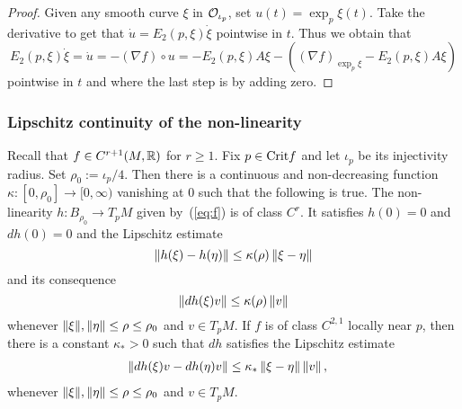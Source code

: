 \documentclass{article}
\begin{document}
\begin{proof}
Given any smooth curve $\xi$ in ${\mathcal{O}}_{\iota_p}$, set
$u(t)=\exp_p\xi(t)$. Take the derivative
to get that $\dot u=E_2(p,\xi)\dot\xi$
pointwise in $t$. Thus we obtain that
$$
     E_2(p,\xi)\dot\xi=\dot u
     =-(\nabla f)\circ u
     =-E_2(p,\xi)A\xi
     -\left((\nabla f)_{\exp_p\xi}-E_2(p,\xi)A\xi\right)
$$
pointwise in $t$ and where the last step is by
adding zero.
\end{proof}


\subsubsection*{Lipschitz continuity of the non-linearity}%
\begin{lemma}
\label{le:f}
   Recall that $f\in C^{r+1}(M,{\mathbb{R}})$ for $r\ge 1$. Fix $p\in{\rm Crit} f$
   and let $\iota_p$ be its injectivity radius. Set $\rho_0:=\iota_p/4$. Then there is
   a continuous and non-decreasing function $\kappa:[0,\rho_0]\to[0,\infty)$
   vanishing at $0$ such that the following is true.
   The non-linearity $h:B_{\rho_0}\to T_pM$ given by~(\ref{eq:f}) is
   of class $C^r$. It satisfies $h(0)=0$ and $dh(0)=0$ and the Lipschitz estimate
   \begin{equation*}
     \left\|h(\xi)-h(\eta)\right\|
     \le \kappa(\rho)\left\|\xi-\eta\right\|
   \end{equation*}
   and its consequence
   \begin{equation}\label{cor:f}
     \Norm{dh(\xi)v}
     \le \kappa(\rho)\Norm{v}
   \end{equation}
   whenever $\mathopen\|\xi\mathclose\|,\mathopen\|\eta\mathclose\|\le\rho\le\rho_0$ and $v\in T_pM$.
   If $f$ is of class $C^{2,1}$ locally near $p$,
   then there is a constant $\kappa_*>0$ such that $dh$ satisfies the Lipschitz estimate
   \begin{equation*}
   \begin{split}
     \left\|dh(\xi)v-dh(\eta)v\right\|
    &\le \kappa_*
     \left\|\xi-\eta\right\|
     \left\|v\right\|,
   \end{split}
   \end{equation*}
   whenever $\mathopen\|\xi\mathclose\|,\mathopen\|\eta\mathclose\| \le\rho\le\rho_0$ and $v\in T_pM$.
\end{lemma}
\end{document}
